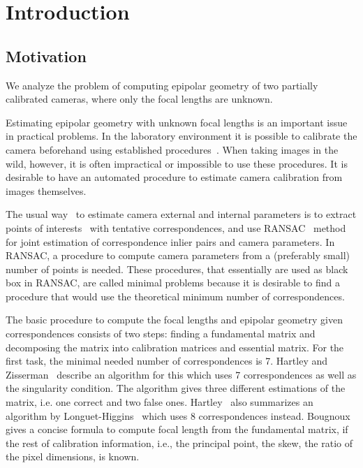 
\chapter{Introduction}
\section{Motivation}
We analyze the problem of computing epipolar geometry of two partially calibrated cameras, where only the focal lengths are unknown.

Estimating epipolar geometry with unknown focal lengths is an important issue in practical problems. In the laboratory environment it is possible to calibrate the camera beforehand using established procedures~\cite{HartZiss}. When taking images in the wild, however, it is often impractical or impossible to use these procedures. It is desirable to have an automated procedure to estimate camera calibration from images themselves. 

The usual way~\cite{bundler,colmap,openMVG} to estimate camera external and internal parameters is to extract points of interests~\cite{SURF,SIFT} with tentative correspondences, and use RANSAC~\cite{USAC} method for joint estimation of correspondence inlier pairs and camera parameters. In RANSAC, a procedure to compute camera parameters from a (preferably small) number of points is needed. These procedures, that essentially are used as black box in RANSAC, are called minimal problems because it is desirable to find a procedure that would use the theoretical minimum number of correspondences.

The basic procedure to compute the focal lengths and epipolar geometry given correspondences consists of two steps: finding a fundamental matrix and decomposing the matrix into calibration matrices and essential matrix. For the first task, the minimal needed number of correspondences is 7. Hartley and Zisserman~\cite{HartZiss} describe an algorithm for this which uses 7 correspondences as well as the singularity condition. The algorithm gives three different estimations of the matrix, i.e. one correct and two false ones. Hartley~\cite{HartleyDefense} also summarizes an  algorithm by Longuet-Higgins~\cite{Higgins} which uses 8 correspondences instead. Bougnoux~\cite{Bougnoux} gives a concise formula to compute focal length from the fundamental matrix, if the rest of calibration information, i.e., the principal point, the skew, the ratio of the pixel dimensions, is known.

